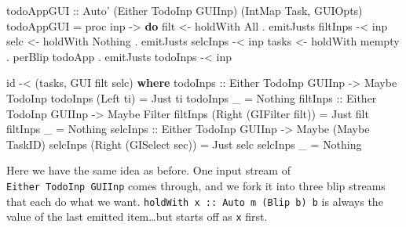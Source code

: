 \documentclass[]{article}
\newenvironment{Shaded}{}{}
\newcommand{\KeywordTok}[1]{\textcolor[rgb]{0.00,0.44,0.13}{\textbf{{#1}}}}
\newcommand{\DataTypeTok}[1]{\textcolor[rgb]{0.56,0.13,0.00}{{#1}}}
\newcommand{\OtherTok}[1]{\textcolor[rgb]{0.00,0.44,0.13}{{#1}}}
\newcommand{\FunctionTok}[1]{\textcolor[rgb]{0.02,0.16,0.49}{{#1}}}
\newcommand{\NormalTok}[1]{{#1}}
\begin{document}
\begin{Shaded}
\begin{Highlighting}[]
\OtherTok{todoAppGUI ::} \DataTypeTok{Auto'} \NormalTok{(}\DataTypeTok{Either} \DataTypeTok{TodoInp} \DataTypeTok{GUIInp}\NormalTok{) (}\DataTypeTok{IntMap} \DataTypeTok{Task}\NormalTok{, }\DataTypeTok{GUIOpts}\NormalTok{)}
\NormalTok{todoAppGUI }\FunctionTok{=} \NormalTok{proc inp }\OtherTok{->} \KeywordTok{do}
    \NormalTok{filt  }\OtherTok{<-} \NormalTok{holdWith }\DataTypeTok{All}                      \FunctionTok{.} \NormalTok{emitJusts filtInps }\FunctionTok{-<} \NormalTok{inp}
    \NormalTok{selc  }\OtherTok{<-} \NormalTok{holdWith }\DataTypeTok{Nothing}                  \FunctionTok{.} \NormalTok{emitJusts selcInps }\FunctionTok{-<} \NormalTok{inp}
    \NormalTok{tasks }\OtherTok{<-} \NormalTok{holdWith mempty }\FunctionTok{.} \NormalTok{perBlip todoApp }\FunctionTok{.} \NormalTok{emitJusts todoInps }\FunctionTok{-<} \NormalTok{inp}

    \NormalTok{id }\FunctionTok{-<} \NormalTok{(tasks, }\DataTypeTok{GUI} \NormalTok{filt selc)}
  \KeywordTok{where}
\OtherTok{    todoInps ::} \DataTypeTok{Either} \DataTypeTok{TodoInp} \DataTypeTok{GUIInp} \OtherTok{->} \DataTypeTok{Maybe} \DataTypeTok{TodoInp}
    \NormalTok{todoInps (}\DataTypeTok{Left} \NormalTok{ti) }\FunctionTok{=} \DataTypeTok{Just} \NormalTok{ti}
    \NormalTok{todoInps _         }\FunctionTok{=} \DataTypeTok{Nothing}
\OtherTok{    filtInps ::} \DataTypeTok{Either} \DataTypeTok{TodoInp} \DataTypeTok{GUIInp} \OtherTok{->} \DataTypeTok{Maybe} \DataTypeTok{Filter}
    \NormalTok{filtInps (}\DataTypeTok{Right} \NormalTok{(}\DataTypeTok{GIFilter} \NormalTok{filt)) }\FunctionTok{=} \DataTypeTok{Just} \NormalTok{filt}
    \NormalTok{filtInps _                       }\FunctionTok{=} \DataTypeTok{Nothing}
\OtherTok{    selcInps ::} \DataTypeTok{Either} \DataTypeTok{TodoInp} \DataTypeTok{GUIInp} \OtherTok{->} \DataTypeTok{Maybe} \NormalTok{(}\DataTypeTok{Maybe} \DataTypeTok{TaskID}\NormalTok{)}
    \NormalTok{selcInps (}\DataTypeTok{Right} \NormalTok{(}\DataTypeTok{GISelect} \NormalTok{sec))  }\FunctionTok{=} \DataTypeTok{Just} \NormalTok{selc}
    \NormalTok{selcInps _                       }\FunctionTok{=} \DataTypeTok{Nothing}
\end{Highlighting}
\end{Shaded}

Here we have the same idea as before. One input stream of
\texttt{Either\ TodoInp\ GUIInp} comes through, and we fork it into
three blip streams that each do what we want.
\texttt{holdWith\ x\ ::\ Auto\ m\ (Blip\ b)\ b} is always the value of
the last emitted item\ldots{}but starts off as \texttt{x} first.
\end{document}
